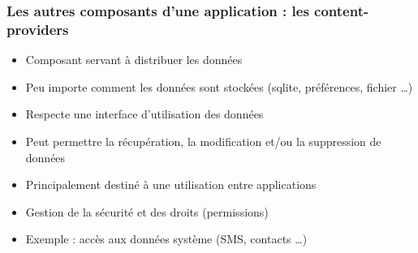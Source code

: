 \documentclass{beamer}
\begin{document}
\begin{frame}[fragile]
\frametitle{Les autres composants d'une application : les content-providers}
\begin{itemize}
  \item Composant servant à distribuer les données
  \item Peu importe comment les données sont stockées (sqlite, préférences, fichier \ldots)
  \item Respecte une interface d'utilisation des données
  \item Peut permettre la récupération, la modification et/ou la suppression de données
  \item Principalement destiné à une utilisation entre applications
  \item Gestion de la sécurité et des droits (permissions)
  \item Exemple : accès aux données système (SMS, contacts \ldots) 
 \end{itemize}
\end{frame}
\end{document}
